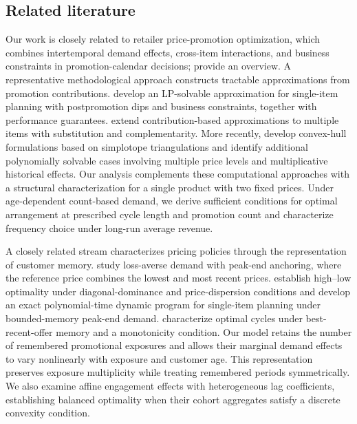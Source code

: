 \subsection{Related literature}
\label{sec:related-literature}
\begingroup\color{black}
Our work is closely related to retailer price-promotion optimization, which combines intertemporal demand effects, cross-item interactions, and business constraints in promotion-calendar decisions; \citet{cohenperakis2020promotions} provide an overview. A representative methodological approach constructs tractable approximations from promotion contributions. \citet{cohen2017promotion} develop an LP-solvable approximation for single-item planning with postpromotion dips and business constraints, together with performance guarantees. \citet{cohen2021multiple} extend contribution-based approximations to multiple items with substitution and complementarity. More recently, \citet{he2026simplotope} develop convex-hull formulations based on simplotope triangulations and identify additional polynomially solvable cases involving multiple price levels and multiplicative historical effects. Our analysis complements these computational approaches with a structural characterization for a single product with two fixed prices. Under age-dependent count-based demand, we derive sufficient conditions for optimal arrangement at prescribed cycle length and promotion count and characterize frequency choice under long-run average revenue.

A closely related stream characterizes pricing policies through the representation of customer memory. \citet{nasiry2011} study loss-averse demand with peak-end anchoring, where the reference price combines the lowest and most recent prices. \citet{cohenhillel2023} establish high--low optimality under diagonal-dominance and price-dispersion conditions and develop an exact polynomial-time dynamic program for single-item planning under bounded-memory peak-end demand. \citet{baek2025} characterize optimal cycles under best-recent-offer memory and a monotonicity condition. Our model retains the number of remembered promotional exposures and allows their marginal demand effects to vary nonlinearly with exposure and customer age. This representation preserves exposure multiplicity while treating remembered periods symmetrically. We also examine affine engagement effects with heterogeneous lag coefficients, establishing balanced optimality when their cohort aggregates satisfy a discrete convexity condition.


